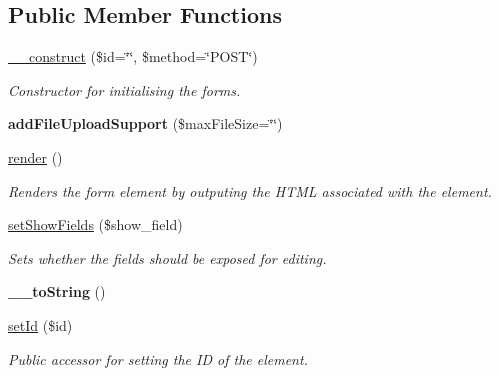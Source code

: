\subsection*{Public Member Functions}
\begin{DoxyCompactItemize}
\item 
\hyperlink{class_form_container_aacafb0c33430ba392fd00ad053fb869c}{\_\-\_\-construct} (\$id=\char`\"{}\char`\"{}, \$method=\char`\"{}POST\char`\"{})
\begin{DoxyCompactList}\small\item\em Constructor for initialising the forms. \item\end{DoxyCompactList}\item 
\hypertarget{class_form_container_a97994acc527b18601ecb814d50f6f60e}{
{\bfseries addFileUploadSupport} (\$maxFileSize=\char`\"{}\char`\"{})}
\label{class_form_container_a97994acc527b18601ecb814d50f6f60e}

\item 
\hyperlink{class_form_container_a3ce5039b18ec388500b8e25b9e226a2d}{render} ()
\begin{DoxyCompactList}\small\item\em Renders the form element by outputing the HTML associated with the element. \item\end{DoxyCompactList}\item 
\hyperlink{class_form_container_a08a118f0323c4e7949a7b065d0cebb0e}{setShowFields} (\$show\_\-field)
\begin{DoxyCompactList}\small\item\em Sets whether the fields should be exposed for editing. \item\end{DoxyCompactList}\item 
\hypertarget{class_form_container_a94654f0c426624c8c77aea71911569b3}{
{\bfseries \_\-\_\-toString} ()}
\label{class_form_container_a94654f0c426624c8c77aea71911569b3}

\item 
\hyperlink{class_form_container_a3f2e3f340a1ad67ae5a3a5733aaee332}{setId} (\$id)
\begin{DoxyCompactList}\small\item\em Public accessor for setting the ID of the element. \item\end{DoxyCompactList}\end{DoxyCompactItemize}
